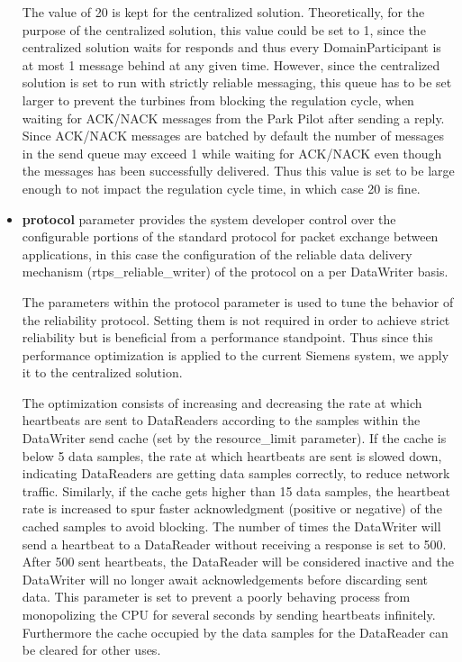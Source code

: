 \begin{itemize}
	The value of 20 is kept for the centralized solution. Theoretically, for the purpose of the centralized solution, this value could be set to 1, since the centralized solution waits for responds and thus every DomainParticipant is at most 1 message behind at any given time. However, since the centralized solution is set to run with strictly reliable messaging, this queue has to be set larger to prevent the turbines from blocking the regulation cycle, when waiting for ACK/NACK messages from the Park Pilot after sending a reply. Since ACK/NACK messages are batched by default the number of messages in the send queue may exceed 1 while waiting for ACK/NACK even though the messages has been successfully delivered. Thus this value is set to be large enough to not impact the regulation cycle time, in which case 20 is fine.
	 
	\item \textbf{protocol} parameter provides the system developer control over the configurable portions of the standard protocol for packet exchange between applications, in this case the configuration of the reliable data delivery mechanism (rtps\_reliable\_writer) of the protocol on a per DataWriter basis. 
	
	The parameters within the protocol parameter is used to tune the behavior of the reliability protocol. Setting them is not required in order to achieve strict reliability but is beneficial from a performance standpoint. Thus since this performance optimization is applied to the current Siemens system, we apply it to the centralized solution.
	
	The optimization consists of increasing and decreasing the rate at which heartbeats are sent to DataReaders according to the samples within the DataWriter send cache (set by the resource\_limit parameter). If the cache is below 5 data samples, the rate at which heartbeats are sent is slowed down, indicating DataReaders are getting data samples correctly, to reduce network traffic. Similarly, if the cache gets higher than 15 data samples, the heartbeat rate is increased to spur faster acknowledgment (positive or negative) of the cached samples to avoid blocking. The number of times the DataWriter will send a heartbeat to a DataReader without receiving a response is set to 500. After 500 sent heartbeats, the DataReader will be considered inactive and the DataWriter will no longer await acknowledgements before discarding sent data. This parameter is set to prevent a poorly behaving process from monopolizing the CPU for several seconds by sending heartbeats infinitely. Furthermore the cache occupied by the data samples for the DataReader can be cleared for other uses.
	

\end{itemize}
